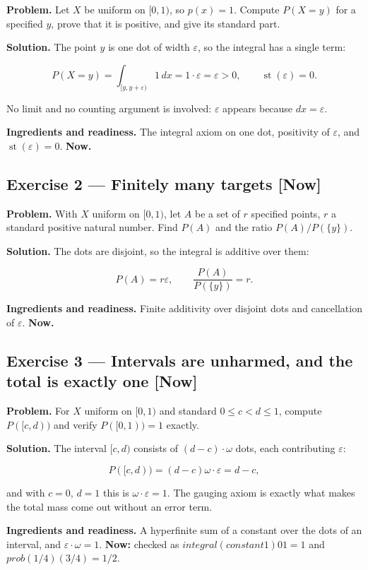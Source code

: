 \documentclass[11pt]{article}
\newcommand{\eps}{\varepsilon}
\renewcommand{\epsilon}{\varepsilon}
\newcommand{\st}{\operatorname{st}}
\begin{document}
\textbf{Problem.} Let $X$ be uniform on $[0,1)$, so $p(x) = 1$. Compute $P(X = y)$
for a specified $y$, prove that it is positive, and give its standard part.

\textbf{Solution.} The point $y$ is one dot of width $\eps$, so the integral has
a single term:

\[
P(X=y)=\int_{[y,y+\epsilon)} 1\,dx=1\cdot\epsilon=\epsilon>0,
\qquad \operatorname{st}(\epsilon)=0 .
\]

No limit and no counting argument is involved: $\eps$ appears because
$dx = \eps$.

\textbf{Ingredients and readiness.} The integral axiom on one dot, positivity of
$\eps$, and $\st(\eps) = 0$. \textbf{Now.}


\subsection*{Exercise 2 --- Finitely many targets \hfill \normalfont\small[Now]}

\textbf{Problem.} With $X$ uniform on $[0,1)$, let $A$ be a set of $r$ specified
points, $r$ a standard positive natural number. Find $P(A)$ and the ratio
$P(A)/P(\{y\})$.

\textbf{Solution.} The dots are disjoint, so the integral is additive over them:

\[
P(A)=r\epsilon,\qquad \frac{P(A)}{P(\{y\})}=r .
\]

\textbf{Ingredients and readiness.} Finite additivity over disjoint dots and
cancellation of $\eps$. \textbf{Now.}


\subsection*{Exercise 3 --- Intervals are unharmed, and the total is exactly one \hfill \normalfont\small[Now]}

\textbf{Problem.} For $X$ uniform on $[0,1)$ and standard $0 \le  c < d \le  1$,
compute $P([c,d))$ and verify $P([0,1)) = 1$ exactly.

\textbf{Solution.} The interval $[c,d)$ consists of $(d-c)\cdot \omega$ dots, each
contributing $\eps$:

\[
P([c,d))=(d-c)\omega\cdot\epsilon=d-c ,
\]

and with $c = 0$, $d = 1$ this is $\omega\cdot \eps = 1$. The gauging axiom is
exactly what makes the total mass come out without an error term.

\textbf{Ingredients and readiness.} A hyperfinite sum of a constant over the dots
of an interval, and $\eps\cdot \omega = 1$. \textbf{Now:} checked as
$integral (constant 1) 0 1 = 1$ and $prob (1/4) (3/4) = 1/2$.
\end{document}
